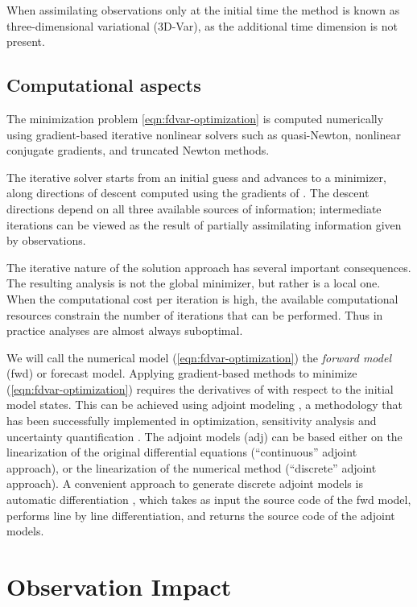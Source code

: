 \documentclass[final,sort&compress]{elsarticle}
\begin{document}
When assimilating observations only at the initial time  the method is known as three-dimensional variational 
(3D-Var), as the additional time dimension is not present. 

\subsection{Computational aspects}


The minimization problem \eqref{eqn:fdvar-optimization} is computed numerically using
gradient-based iterative nonlinear solvers such as
quasi-Newton, nonlinear conjugate gradients, and truncated Newton methods. 

The iterative solver starts from an initial guess and advances to a minimizer,
along directions of descent computed using the gradients of . 
The descent directions depend on all three available sources of information;
intermediate iterations
can be viewed as the result of partially assimilating information given by observations.

The iterative nature of the solution approach has several important consequences.
The resulting analysis is not the global minimizer, but rather is a local one.
When the computational cost per iteration is high, the available
computational resources constrain the number of iterations that can be performed. 
Thus in practice analyses are almost always suboptimal.

We will call the numerical model  (\ref{eqn:fdvar-optimization}) the {\em forward model} ({\sc fwd}) or forecast model.
Applying gradient-based methods to minimize (\ref{eqn:fdvar-optimization}) requires the derivatives of  with respect to the initial model states.
This can be achieved using adjoint modeling \cite{cacuci1981sensitivity,wang1992second},
a methodology that has been successfully implemented in optimization, sensitivity analysis and uncertainty quantification
\cite{sandu2008discrete,SanduADJ_2005,Cioaca_2011}.
The adjoint models ({\sc adj}) can be based either on the linearization of the original differential equations (``continuous'' adjoint approach),
or the linearization of the numerical method (``discrete'' adjoint approach).
A convenient approach to generate discrete adjoint models is automatic differentiation  \cite{griewank1989automatic},
which takes as input the source code of the {\sc fwd} model, performs line by line differentiation, and returns the source code of the adjoint models.

\section{Observation Impact}\label{sec:oim}
\end{document}
